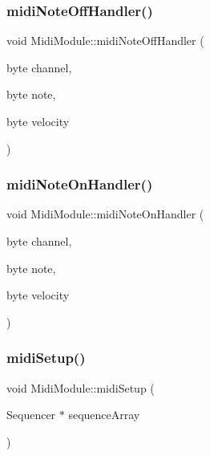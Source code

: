 \subsubsection{\texorpdfstring{midi\+Note\+Off\+Handler()}{midiNoteOffHandler()}}
{\footnotesize\ttfamily void Midi\+Module\+::midi\+Note\+Off\+Handler (\begin{DoxyParamCaption}\item[{byte}]{channel,  }\item[{byte}]{note,  }\item[{byte}]{velocity }\end{DoxyParamCaption})}

\mbox{\label{class_midi_module_a9d949d05ada00beebe12e01589309699}} 
\subsubsection{\texorpdfstring{midi\+Note\+On\+Handler()}{midiNoteOnHandler()}}
{\footnotesize\ttfamily void Midi\+Module\+::midi\+Note\+On\+Handler (\begin{DoxyParamCaption}\item[{byte}]{channel,  }\item[{byte}]{note,  }\item[{byte}]{velocity }\end{DoxyParamCaption})}

\mbox{\label{class_midi_module_a01d9e776bbe4586a3d69a4e3daa54198}} 
\subsubsection{\texorpdfstring{midi\+Setup()}{midiSetup()}}
{\footnotesize\ttfamily void Midi\+Module\+::midi\+Setup (\begin{DoxyParamCaption}\item[{Sequencer $\ast$}]{sequence\+Array }\end{DoxyParamCaption})}

\mbox{\label{class_midi_module_aa3e24f459a5a9d732ca60c9bb8ac943c}} 
